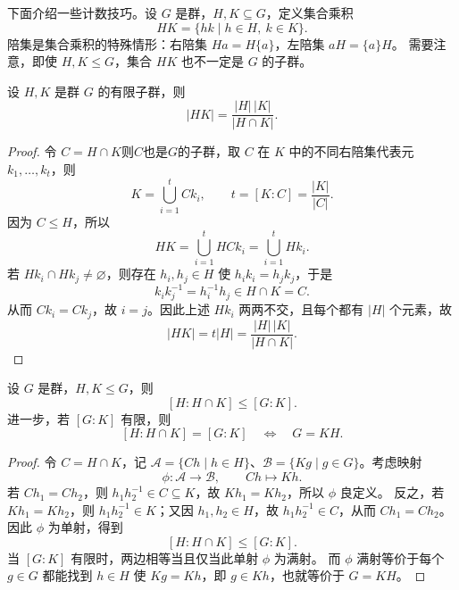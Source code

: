 \begin{purplenote}
下面介绍一些计数技巧。设 $G$ 是群，$H,K\subseteq G$，定义集合乘积
\[
  HK=\{hk\mid h\in H,\ k\in K\}.
\]
陪集是集合乘积的特殊情形：右陪集 $Ha=H\{a\}$，左陪集 $aH=\{a\}H$。
需要注意，即使 $H,K\leq G$，集合 $HK$ 也不一定是 $G$ 的子群。
\end{purplenote}

\begin{theorem}[子群乘积的大小]\label{prop:HK-cardinality}
设 $H,K$ 是群 $G$ 的有限子群，则
\[
  |HK|=\frac{|H|\,|K|}{|H\cap K|}.
\]
\end{theorem}

\begin{proof}
令 $C=H\cap K$则$C$也是$G$的子群，取 $C$ 在 $K$ 中的不同右陪集代表元 $k_1,\ldots,k_t$，则
\[
  K=\bigcup_{i=1}^t Ck_i,
  \qquad t=[K:C]=\frac{|K|}{|C|}.
\]
因为 $C\leq H$，所以
\[
  HK=\bigcup_{i=1}^t HCk_i=\bigcup_{i=1}^t Hk_i.
\]
若 $Hk_i\cap Hk_j\neq\varnothing$，则存在 $h_i,h_j\in H$ 使 $h_i k_i=h_j k_j$，于是
\[
  k_i k_j^{-1}=h_i^{-1}h_j\in H\cap K=C.
\]
从而 $Ck_i=Ck_j$，故 $i=j$。因此上述 $Hk_i$ 两两不交，且每个都有 $|H|$ 个元素，故
\[
  |HK|=t|H|=\frac{|H|\,|K|}{|H\cap K|}.
\]
\end{proof}

\begin{proposition}[子群中的相对指数]\label{prop:index-intersection}
设 $G$ 是群，$H,K\leq G$，则
\[
  [H:H\cap K]\leq[G:K].
\]
进一步，若 $[G:K]$ 有限，则
\[
  [H:H\cap K]=[G:K]\quad\Longleftrightarrow\quad G=KH.
\]
\end{proposition}

\begin{proof}
令 $C=H\cap K$，记 $\mathcal A=\{Ch\mid h\in H\}$、$\mathcal B=\{Kg\mid g\in G\}$。考虑映射
\[
  \phi:\mathcal A\longrightarrow\mathcal B,
  \qquad Ch\longmapsto Kh.
\]
若 $Ch_1=Ch_2$，则 $h_1h_2^{-1}\in C\subseteq K$，故 $Kh_1=Kh_2$，所以 $\phi$ 良定义。
反之，若 $Kh_1=Kh_2$，则 $h_1h_2^{-1}\in K$；又因 $h_1,h_2\in H$，故 $h_1h_2^{-1}\in C$，从而 $Ch_1=Ch_2$。因此 $\phi$ 为单射，得到
\[
  [H:H\cap K]\leq[G:K].
\]
当 $[G:K]$ 有限时，两边相等当且仅当此单射 $\phi$ 为满射。
而 $\phi$ 满射等价于每个 $g\in G$ 都能找到 $h\in H$ 使 $Kg=Kh$，即 $g\in Kh$，也就等价于 $G=KH$。
\end{proof}

